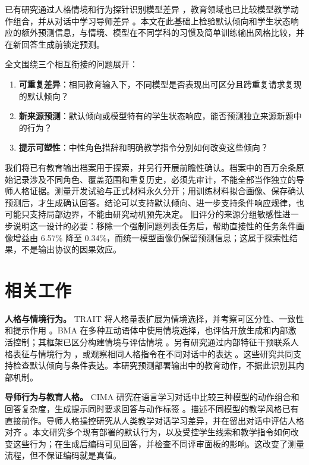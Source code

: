 \documentclass[11pt,a4paper,UTF8]{ctexart}
\begin{document}
已有研究通过人格情境和行为探针识别模型差异 \citep{lee2025trait,liu2026bma}，教育领域也已比较模型教学动作组合，并从对话中学习导师差异 \citep{kucheria2025cima,lee2026tutorpersonas}。本文在此基础上检验默认倾向和学生状态响应的额外预测信息，与情境、模型在不同学科的习惯及简单训练输出风格比较，并在新回答生成前锁定预测。

全文围绕三个相互衔接的问题展开：

\begin{enumerate}
\item \textbf{可重复差异}：相同教育输入下，不同模型是否表现出可区分且跨重复请求复现的默认倾向？
\item \textbf{新来源预测}：默认倾向或模型特有的学生状态响应，能否预测独立来源新题中的行为？
\item \textbf{提示可塑性}：中性角色措辞和明确教学指令分别如何改变这些倾向？
\end{enumerate}

我们将已有教育输出档案用于探索，并另行开展前瞻性确认。档案中的百万余条原始记录涉及不同角色、覆盖范围和重复历史，必须先审计，不能全部当作独立的导师人格证据。测量开发试验与正式材料永久分开；用训练材料拟合画像、保存确认预测后，才生成确认回答。结论可以支持默认倾向、进一步支持条件响应规律，也可能只支持局部边界，不能由研究动机预先决定。 旧评分的来源分组敏感性进一步说明这一设计的必要：移除一个强制问题列表任务后，帮助直接性的任务条件画像增益由 6.57\% 降至 0.34\%，而统一模型画像仍保留预测信息；这属于探索性结果，不是输出协议的因果效应。

\section{相关工作}

\textbf{人格与情境行为。} TRAIT 将人格量表扩展为情境选择，并考察可区分性、一致性和提示作用 \citep{lee2025trait}。BMA 在多种互动语体中使用情境选择，也评估开放生成和内部激活控制；其框架已区分构建情境与评估情境 \citep{liu2026bma}。另有研究通过内部特征干预联系人格表征与情境行为 \citep{zhang2026triad}，或观察相同人格指令在不同对话中的表达 \citep{han2026contexts}。这些研究共同支持检查默认倾向与条件表达。本研究预测部署输出中的教育动作，不据此识别其内部机制。

\textbf{导师行为与教育人格。} CIMA 研究在语言学习对话中比较三种模型的动作组合和回答复杂度，生成提示同时要求回答与动作标签 \citep{kucheria2025cima}。描述不同模型的教学风格已有直接前作。导师人格操控研究从人类教学对话学习差异，并在留出对话中评估人格对齐 \citep{lee2026tutorpersonas}。本文研究多个现有部署的默认行为，以及受控学生线索和教学指令如何改变这些行为；在生成后编码可见回答，并检查不同评审面板的影响。这改变了测量流程，但不保证编码就是真值。
\end{document}
